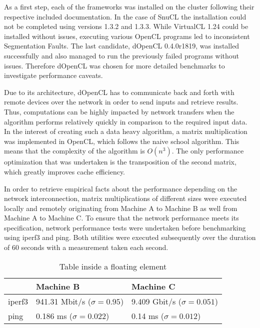 As a first step, each of the frameworks was installed on the cluster following their respective included documentation. In the case of SnuCL the installation could not be completed using versions 1.3.2 and 1.3.3. While VirtualCL 1.24 could be installed without issues, executing various OpenCL programs led to inconsistent Segmentation Faults. The last candidate, dOpenCL 0.4.0r1819, was installed successfully and also managed to run the previously failed programs without issues. Therefore dOpenCL was chosen for more detailed benchmarks to investigate performance caveats.

Due to its architecture, dOpenCL has to communicate back and forth with remote devices over the network in order to send inputs and retrieve results. Thus, computations can be highly impacted by network transfers when the algorithm performs relatively quickly in comparison to the required input data. In the interest of creating such a data heavy algorithm, a matrix multiplication was implemented in OpenCL, which follows the naive school algorithm. This means that the complexity of the algorithm is $O(n^3)$. The only performance optimization that was undertaken is the transposition of the second matrix, which greatly improves cache efficiency.

In order to retrieve empirical facts about the performance depending on the network interconnection, matrix multiplications of different sizes were executed locally and remotely originating from Machine A to Machine B as well from Machine A to Machine C. To ensure that the network performance meets its specification, network performance tests were undertaken before benchmarking using iperf3 and ping. Both utilities were executed subsequently over the duration of 60 seconds with a measurement taken each second.

\begin{table}[htb]
	\centering
	\begin{adjustbox}{width=1\textwidth}
		\small
		\begin{tabular}{l | l | l}
			~                     & Machine B                  			& Machine C                  \\
			\hline
			iperf3                & 941.31 Mbit/s ($\sigma = 0.95$) 	& 9.409 Gbit/s ($\sigma = 0.051$) \\
			ping                  & 0.186 ms ($\sigma = 0.022$)  		& 0.14 ms ($\sigma = 0.012$)  \\
		\end{tabular}
	\end{adjustbox}
	
	\caption{Table inside a floating element}
	\label{table:ta}
\end{table}


